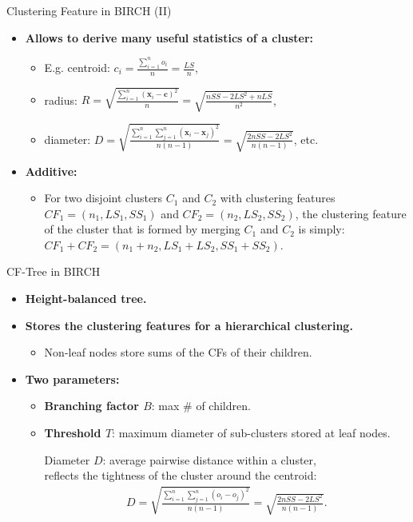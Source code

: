 \begin{frame}{Clustering Feature in BIRCH (II)}
  \begin{itemize}
  \item \textbf{Allows to derive many useful statistics of a cluster:}
    \begin{itemize}
    \item E.g. centroid: $c_i = \frac{\sum_{i=1}^{n}o_i}{n} =
      \frac{LS}{n}$,
    \item radius: $R =
      \sqrt{\frac{\sum_{i=1}^{n}(\mathbf{x}_i-\mathbf{c})^2}{n}} =
      \sqrt{\frac{nSS-2LS^2+nLS}{n^2}}$,
    \item diameter: $D =
      \sqrt{\frac{\sum_{i=1}^{n}\sum_{j=1}^{n}(\mathbf{x}_i-\mathbf{x}_j)^2}{n(n-1)}}
      = \sqrt{\frac{2nSS-2LS^2}{n(n-1)}}$, etc.
    \end{itemize}
  \item \textbf{Additive:}
    \begin{itemize}
    \item For two disjoint clusters $C_1$ and $C_2$ with clustering
      features $CF_1 = (n_1, LS_1, SS_1)$ and $CF_2 = (n_2, LS_2, SS_2)$,
      the clustering feature of the cluster that is formed by merging
      $C_1$ and $C_2$ is simply: $CF_1 + CF_2 = (n_1 + n_2, LS_1 + LS_2,
      SS_1 + SS_2)$.
    \end{itemize}
  \end{itemize}
\end{frame}

\begin{frame}{CF-Tree in BIRCH}
  \begin{itemize}
  \item \textbf{Height-balanced tree.}
  \item \textbf{Stores the clustering features for a hierarchical
      clustering.}
    \begin{itemize}
    \item Non-leaf nodes store sums of the CFs of their children.
    \end{itemize}
  \item \textbf{Two parameters:}
    \begin{itemize}
    \item \textbf{\color{airforceblue}Branching factor $B$}: max \# of
      children.
    \item \textbf{\color{airforceblue}Threshold $T$}: maximum diameter
      of sub-clusters stored at leaf nodes.

      Diameter $D$: average pairwise distance within a cluster,
      \\
      reflects the tightness of the cluster around the centroid:
      \begin{align}
        D = \sqrt{\frac{\sum_{i=1}^{n} \sum_{j=1}^{n}
        (o_i-o_j)^2}{n(n-1)}} = \sqrt{\frac{2nSS - 2LS^2}{n(n-1)}}.
      \end{align}

    \end{itemize}
  \end{itemize}
\end{frame}

